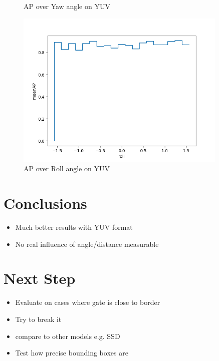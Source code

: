 \documentclass{article}
\begin{document}
\begin{figure}[!htb]
\begin{minipage}{.5\textwidth}
		\caption{AP over Yaw angle on YUV }
	\end{minipage}%
	\begin{minipage}{0.5\textwidth}
		\centering
		\includegraphics[width=0.9\textwidth]{meanAP-roll}
		\caption{AP over Roll angle on YUV}
	\end{minipage}
\end{figure}
\section{Conclusions}
\begin{itemize}
	\item Much better results with YUV format
	\item No real influence of angle/distance measurable
\end{itemize}
\section{Next Step}
\begin{itemize}
	\item Evaluate on cases where gate is close to border
	\item Try to break it
	\item compare to other models e.g. SSD
	\item Test how precise bounding boxes are
\end{itemize}








\end{document}
